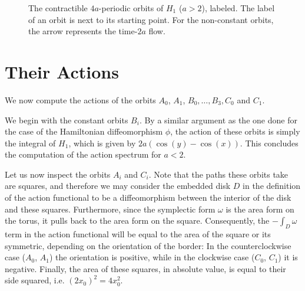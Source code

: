 \begin{figure}
\centering
{}
\caption{The contractible $4a$-periodic orbits of $H_1$ ($a > 2$), labeled. The label of an orbit is next to its starting point. For the non-constant orbits, the arrow represents the time-$2a$ flow.}
\label{orbitsh12}
\end{figure}

\section{Their Actions}

We now compute the actions of the orbits $A_0$, $A_1$, $B_0, \dots, B_3, C_0$ and $C_1$.

We begin with the constant orbits $B_i$. By a similar argument as the one done for the case of the Hamiltonian diffeomorphism $\phi$, the action of these orbits is simply the integral of $H_1$, which is given by $2a(\cos(y) - \cos(x))$. This concludes the computation of the action spectrum for $a < 2$.

Let us now inspect the orbits $A_i$ and $C_i$. Note that the paths these orbits take are squares, and therefore we may consider the embedded disk $D$ in the definition of the action functional to be a diffeomorphism between the interior of the disk and these squares. Furthermore, since the symplectic form $\omega$ is the area form on the torus, it pulls back to the area form on the square. Consequently, the $- \int_D \omega$ term in the action functional will be equal to the area of the square or its symmetric, depending on the orientation of the border: In the counterclockwise case ($A_0$, $A_1$) the orientation is positive, while in the clockwise case ($C_0$, $C_1$) it is negative. Finally, the area of these squares, in absolute value, is equal to their side squared, i.e. $(2x_0)^2 = 4x_0^2$.

